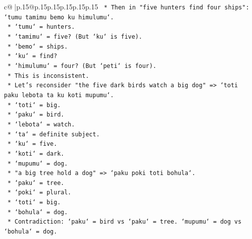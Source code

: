 \documentclass{article}
\begin{document}
{\begin{supertabular}{c@{$\;$}|p{.15\linewidth}@{}p{.15\linewidth}p{.15\linewidth}p{.15\linewidth}p{.15\linewidth}p{.15\linewidth}}
{{{\texttt{                                        *   Then in "five hunters find four ships": `tumu tamimu bemo ku himulumu`.} \\
\texttt{                                            *   `tumu` = hunters.} \\
\texttt{                                            *   `tamimu` = five? (But `ku` is five).} \\
\texttt{                                            *   `bemo` = ships.} \\
\texttt{                                            *   `ku` = find?} \\
\texttt{                                            *   `himulumu` = four? (But `peti` is four).} \\
\texttt{                                            *   This is inconsistent.} \\
\texttt{                                            *   Let's reconsider "the five dark birds watch a big dog" => `toti paku lebota ta ku koti mupumu`.} \\
\texttt{                                                *   `toti` = big.} \\
\texttt{                                                *   `paku` = bird.} \\
\texttt{                                                *   `lebota` = watch.} \\
\texttt{                                                *   `ta` = definite subject.} \\
\texttt{                                                *   `ku` = five.} \\
\texttt{                                                *   `koti` = dark.} \\
\texttt{                                                *   `mupumu` = dog.} \\
\texttt{                                            *   "a big tree hold a dog" => `paku poki toti bohula`.} \\
\texttt{                                                *   `paku` = tree.} \\
\texttt{                                                *   `poki` = plural.} \\
\texttt{                                                *   `toti` = big.} \\
\texttt{                                                *   `bohula` = dog.} \\
\texttt{                                            *   Contradiction: `paku` = bird vs `paku` = tree. `mupumu` = dog vs `bohula` = dog.} \\
}}}
\end{supertabular}}
\end{document}
